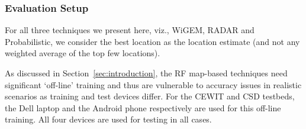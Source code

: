 %

\subsubsection{Evaluation Setup}
\label{subsubsec:rfsignalmapdiscussion}


For all three techniques we present here, viz., WiGEM, RADAR and Probabilistic, we consider the best location as the location estimate (and not any weighted average of the top few locations). 

As discussed in Section~\ref{sec:introduction}, the RF map-based techniques need significant `off-line' training and thus are vulnerable to accuracy issues in realistic scenarios as training
and test devices differ. For the CEWIT and CSD testbeds, the Dell laptop 
and the Android phone respectively are used for this off-line
training. All four devices are used for testing in all cases. 


